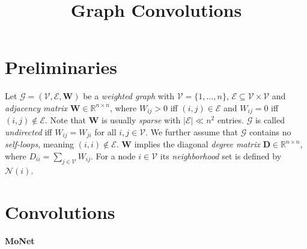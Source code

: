 \documentclass[pdftex,10pt,a4paper]{scrartcl}
\title{Graph Convolutions}
\date{\vspace{-5ex}}
\begin{document}
\maketitle

\section{Preliminaries}

Let $\mathcal{G} = (\mathcal{V}, \mathcal{E}, \mathbf{W})$ be a \emph{weighted graph} with $\mathcal{V} = \{1, \ldots, n\}$, $\mathcal{E} \subseteq \mathcal{V} \times \mathcal{V}$ and \emph{adjacency matrix} $\mathbf{W} \in \mathbb{R}^{n \times n}$, where $W_{ij} > 0$ iff $(i, j) \in \mathcal{E}$ and $W_{ij} = 0$ iff $(i, j) \not\in \mathcal{E}$.
Note that $\mathbf{W}$ is usually \emph{sparse} with $|\mathcal{E}| \ll n^2$ entries.
$\mathcal{G}$ is called \emph{undirected} iff $W_{ij} = W_{ji}$ for all $i,j \in \mathcal{V}$.
We further assume that $\mathcal{G}$ contains no \emph{self-loops}, meaning $(i, i) \not\in \mathcal{E}$.
$\mathbf{W}$ implies the diagonal \emph{degree matrix} $\mathbf{D} \in \mathbb{R}^{n \times n}$, where $D_{ii} = \sum_{j \in \mathcal{V}} W_{ij}$.
For a node $i \in \mathcal{V}$ its \emph{neighborhood} set is defined by $\mathcal{N}(i)$.





\section{Convolutions}

\paragraph{MoNet}
\end{document}
